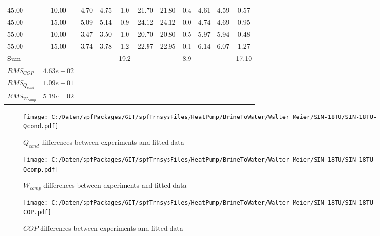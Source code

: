 \documentclass[english]{SPFShortReport}
\begin{document}
\begin{table}[!ht]
\begin{small}
\begin{center}
{\begin{tabular}{l | c c c c c c c c c c }
45.00  & 10.00 & 4.70 & 4.75 & 1.0 & 21.70 & 21.80 & 0.4 & 4.61 & 4.59 & 0.57\\ 
45.00  & 15.00 & 5.09 & 5.14 & 0.9 & 24.12 & 24.12 & 0.0 & 4.74 & 4.69 & 0.95\\ 
55.00  & 10.00 & 3.47 & 3.50 & 1.0 & 20.70 & 20.80 & 0.5 & 5.97 & 5.94 & 0.48\\ 
55.00  & 15.00 & 3.74 & 3.78 & 1.2 & 22.97 & 22.95 & 0.1 & 6.14 & 6.07 & 1.27\\ 
\hline 
 Sum &  & &  & 19.2 &  &  & 8.9 & &  & 17.10\\ 
\hline 
 $RMS_{COP}$ & $4.63e-02$ \\ 
 $RMS_{Q_{cond}}$ & $1.09e-01$ \\ 
 $RMS_{W_{comp}}$ & $5.19e-02$ \\ 
\hline
\hline
\end{tabular}
}
\label{ErrorsTable}
\end{center}
\end{small}
\end{table}
\begin{figure}[!ht]
\begin{center}
\texttt{[image: C:/Daten/spfPackages/GIT/spfTrnsysFiles/HeatPump/BrineToWater/Walter Meier/SIN-18TU/SIN-18TU-Qcond.pdf]}
\caption{$Q_{cond}$ differences between experiments and fitted data}
\label{QcongFig}
\end{center}
\end{figure}
\begin{figure}[!ht]
\begin{center}
\texttt{[image: C:/Daten/spfPackages/GIT/spfTrnsysFiles/HeatPump/BrineToWater/Walter Meier/SIN-18TU/SIN-18TU-Qcomp.pdf]}
\caption{$W_{comp}$ differences between experiments and fitted data}
\label{QcompFig}
\end{center}
\end{figure}
\begin{figure}[!ht]
\begin{center}
\texttt{[image: C:/Daten/spfPackages/GIT/spfTrnsysFiles/HeatPump/BrineToWater/Walter Meier/SIN-18TU/SIN-18TU-COP.pdf]}
\caption{$COP$ differences between experiments and fitted data}
\label{COPFig}
\end{center}
\end{figure}
\end{document}
